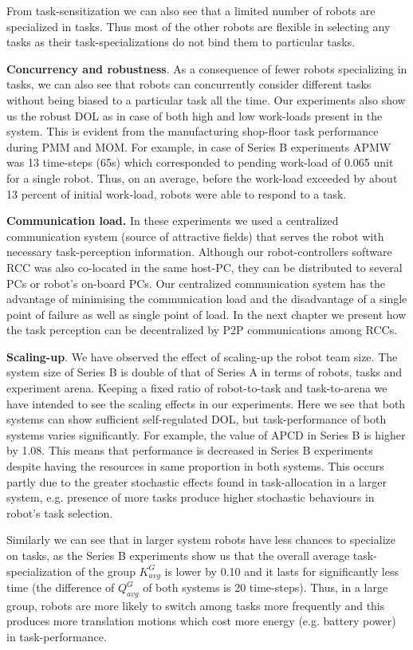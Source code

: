 \documentclass[final,5p,times,twocolumn]{elsarticle}
\begin{document}
From task-sensitization we can also see that a limited number of robots are specialized in tasks. Thus most of the other robots are flexible in selecting any tasks as their task-specializations do not bind them to particular tasks.

\textbf{Concurrency and robustness}. As a consequence of fewer robots specializing in tasks, we can also see that robots can concurrently  consider different tasks without being biased to a particular task all the time. Our experiments also show us the robust DOL as in case of  both high and low work-loads present in the system. This is evident from the manufacturing shop-floor task performance during PMM and MOM. For example,  in case of Series B experiments APMW was 13 time-steps (65s) which corresponded  to pending work-load of 0.065 unit for a single robot. Thus, on an average, before the work-load exceeded by about 13 percent of initial work-load, robots were able to respond to  a task.

\textbf{Communication load.} In these experiments we used a centralized communication system (source of attractive fields) that serves the robot with necessary task-perception information. Although our robot-controllers software RCC was also co-located in the same host-PC, they can be distributed to several PCs or robot's on-board PCs. Our centralized communication system has the advantage of minimising the communication load and the disadvantage of a single point of failure as well as single point of load. In the next chapter we present how the task perception can be decentralized by P2P communications among RCCs.

\textbf{Scaling-up}. We have observed the effect of scaling-up the robot team size. The system size of Series B is double of that of Series A in terms of robots, tasks and experiment arena. Keeping a fixed ratio of robot-to-task and task-to-arena we have intended to see the scaling effects in our experiments. Here we see that both systems can show sufficient self-regulated DOL, but task-performance of both systems varies significantly. For example, the value of APCD in Series B is higher by 1.08. This means that performance  is decreased in Series B experiments despite having the resources in same proportion in both systems. This occurs partly due to the greater stochastic effects found in task-allocation in a larger system, e.g. presence of more tasks produce higher stochastic behaviours in robot's task selection.

Similarly we can see that in larger system robots have less chances to specialize on tasks, as the Series B experiments show us that the overall average task-specialization of the group $K^G_{avg}$ is lower by 0.10 and it lasts for significantly less time (the difference of $Q^G_{avg}$  of both systems is 20 time-steps). Thus, in a large group, robots are more likely to switch among tasks more frequently and this produces more translation motions which cost more energy (e.g. battery power) in task-performance.
\end{document}
